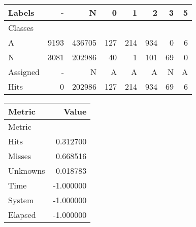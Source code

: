\begin{tabular}{l|r|r|r|r|r|r|r}

Labels &     - &       N &    0 &    1 &    2 &   3 &  5 \\\hline
Classes  &       &         &      &      &      &     &    \\\hline
\hline
A        &  9193 &  436705 &  127 &  214 &  934 &   0 &  6 \\\hline
N        &  3081 &  202986 &   40 &    1 &  101 &  69 &  0 \\\hline
\hline
Assigned &     - &       N &    A &    A &    A &   N &  A \\\hline
Hits     &     0 &  202986 &  127 &  214 &  934 &  69 &  6 
\end{tabular}
\begin{tabular}{l|r}

Metric   &     Value \\\hline
Metric   &           \\\hline
\hline
Hits     &  0.312700 \\\hline
Misses   &  0.668516 \\\hline
Unknowns &  0.018783 \\\hline
Time     & -1.000000 \\\hline
System   & -1.000000 \\\hline
Elapsed  & -1.000000 
\end{tabular}
